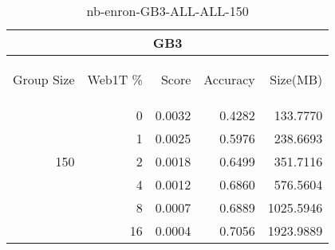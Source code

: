 \begin{center}
\begin{table}[htbp]
\begin{tabular}{ | r | r | r | r | r |}
\hline
\multicolumn{5}{|c|}{GB3}\\
\hline
\begin{sideways}Group Size\end{sideways} & \begin{sideways}Web1T \%\end{sideways} & \begin{sideways}Score\end{sideways} & \begin{sideways}Accuracy\end{sideways} & \begin{sideways}Size(MB)\end{sideways}\\
\hline
\multirow{5}{*}{150}
 & 0 & 0.0032 & 0.4282 & 133.7770\\ \cline{2-5}
 & 1 & 0.0025 & 0.5976 & 238.6693\\ \cline{2-5}
 & 2 & 0.0018 & 0.6499 & 351.7116\\ \cline{2-5}
 & 4 & 0.0012 & 0.6860 & 576.5604\\ \cline{2-5}
 & 8 & 0.0007 & 0.6889 & 1025.5946\\ \cline{2-5}
 & 16 & 0.0004 & 0.7056 & 1923.9889\\ \cline{2-5}
\hline
\end{tabular}
\caption{nb-enron-GB3-ALL-ALL-150}
\label{table:nb-enron-GB3-ALL-ALL-150}
\end{table}
\end{center}

